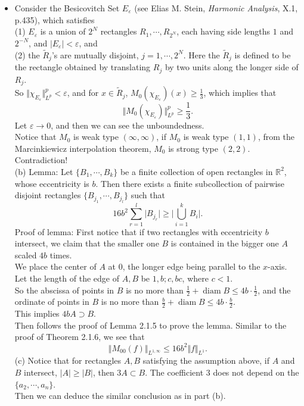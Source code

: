 \begin{itemize}
\item[2.1.9]

Consider the Besicovitch Set $E_\varepsilon$ (see Elias M. Stein, 
\textit{Harmonic Analysis}, X.1, p.435), which satisfies \\
(1) $E_\varepsilon $ is a union of $2^N$ rectangles $R_1,\cdots, R_{2^N}$, 
each having side lengths $1$ and $2^{-N}$, 
and $| E_\varepsilon |<\varepsilon$, and \\
(2) the $\widetilde{R}_j$'s are mutually disjoint, $j=1,\cdots,2^N$. 
Here the $\widetilde{R}_j$ is defined to be the rectangle obtained 
by translating $R_j$ by two units along the longer side of $R_j$.\\
So $\Vert \chi_{E_\varepsilon}\Vert_{L^p}^p<\varepsilon$, 
and for $x\in \widetilde{R}_j$, $M_0(\chi_{E_\varepsilon})(x)\geq \frac13$, 
which implies that 
$$\Vert M_0(\chi_{E_\varepsilon})\Vert_{L^p}^p\geq \frac13.$$
Let $\varepsilon \rightarrow 0$, and then we can see the unboundedness.\\
Notice that $M_0$ is weak type $(\infty,\infty)$, if $M_0$ is weak type $(1,1)$, 
from the Marcinkiewicz interpolation theorem, $M_0$ is strong type $(2,2)$. Contradiction!\\
(b) Lemma: 
Let $\{B_1,\cdots,B_k\}$ be a finite collection of open rectangles 
in $\mathbb{R}^2$, whose eccentricity is $b$. 
Then there exists a finite subcollection of pairwise disjoint rectangles 
$\{B_{j_1},\cdots,B_{j_l}\}$ such that 
$$16b^2\sum\limits_{r=1}^l\vert B_{j_r}\vert\geq\vert \mathop{\bigcup}\limits_{i=1}^kB_i\vert.$$
Proof of lemma: 
First notice that if two rectangles with eccentricity $b$ intersect, 
we claim that the smaller one $B$ is contained in the bigger one $A$ scaled $4b$ times.\\
We place the center of $A$ at $0$, the longer edge being parallel to the $x$-axis. 
Let the length of the edge of $A,B$ be $1,b;c,bc$, where $c<1$.\\
So the abscissa of points in $B$ is no more than 
$\frac12+\operatorname{diam}{B}\leq 4b\cdot\frac12$, 
and the ordinate of points in $B$ is no more than 
$\frac{b}2+\operatorname{diam}B\leq4b\cdot\frac{b}2$.\\
This implies $4bA\supset B$.\\
Then follows the proof of Lemma 2.1.5 to prove the lemma. 
Similar to the proof of Theorem 2.1.6, we see that 
$$\Vert M_{00}(f)\Vert_{L^{1,\infty}}\leq 16b^2\Vert f\Vert _{L^1}.$$
(c) Notice that for rectangles $A,B$ satisfying the assumption above, 
if $A$ and $B$ intersect, $\vert A\vert\geq \vert B \vert$, then $3A \subset B$. 
The coefficient $3$ does not depend on the $\{a_2,\cdots,a_n\}$.\\
Then we can deduce the similar conclusion as in part (b).


\end{itemize}
